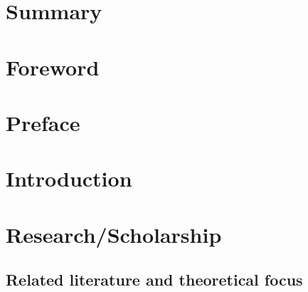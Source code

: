 \chapter*{Summary}


\chapter*{Foreword}


\chapter*{Preface}


\chapter{Introduction}
 

\chapter{Research/Scholarship}
 

  \section{Related literature and theoretical focus}
   

